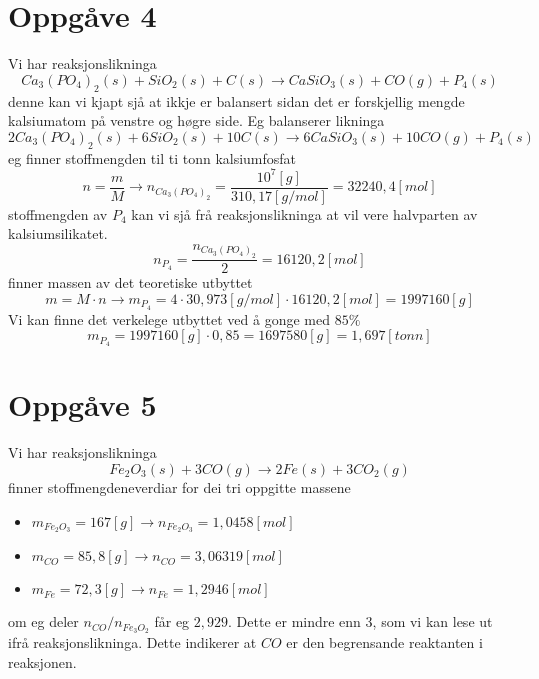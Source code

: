 \documentclass[12pt,a4paper]{article}
\begin{document}
  \section*{Oppgåve 4}
    Vi har reaksjonslikninga
    \begin{equation}
      Ca_3(PO_4)_2(s) + SiO_2(s) + C(s) \longrightarrow CaSiO_3(s) + CO(g) + P_4(s)
    \end{equation}
    denne kan vi kjapt sjå at ikkje er balansert sidan det er forskjellig mengde
    kalsiumatom på venstre og høgre side. Eg balanserer likninga
    \begin{equation}
      2Ca_3(PO_4)_2(s) + 6SiO_2(s) + 10C(s) \longrightarrow 6CaSiO_3(s) + 10CO(g) + P_4(s)
    \end{equation}
    eg finner stoffmengden til ti tonn kalsiumfosfat
    \begin{equation}
      n = \frac{m}{M}\rightarrow n_{Ca_3(PO_4)_2} = \frac{10^{7}[g]}{310,17[g/mol]} = 32240,4[mol]
    \end{equation}
    stoffmengden av $P_4$ kan vi sjå frå reaksjonslikninga at vil vere halvparten av
    kalsiumsilikatet.
    \begin{equation}
      n_{P_4} = \frac{n_{Ca_3(PO_4)_2}}{2} = 16120,2[mol]
    \end{equation}
    finner massen av det teoretiske utbyttet
    \begin{equation}
      m = M\cdot n \rightarrow m_{P_4} = 4\cdot30,973[g/mol] \cdot 16120,2[mol] = 1997160[g]
    \end{equation}
    Vi kan finne det verkelege utbyttet ved å gonge med $85\%$
    \begin{equation}
      m_{P_4} = 1997160[g] \cdot 0,85 = 1697580[g] = 1,697[tonn]
    \end{equation}


  \section*{Oppgåve 5}
    Vi har reaksjonslikninga
    \begin{equation}
      Fe_2O_3(s) + 3CO(g) \longrightarrow 2Fe(s) + 3CO_2(g)
    \end{equation}
    finner stoffmengdeneverdiar for dei tri oppgitte massene
    \begin{itemize}
      \item $m_{Fe_2O_3} = 167[g] \longrightarrow n_{Fe_2O_3} = 1,0458[mol]$
      \item $m_{CO} = 85,8[g] \longrightarrow n_{CO} = 3,06319[mol]$
      \item $m_{Fe} = 72,3[g] \longrightarrow n_{Fe} = 1,2946[mol]$
    \end{itemize}
    om eg deler $n_{CO} / n_{Fe_3O_2}$ får eg $2,929$. Dette er mindre enn $3$, som vi kan lese ut
    ifrå reaksjonslikninga. Dette indikerer at $CO$ er den begrensande reaktanten i reaksjonen.
    \bigskip
\end{document}
